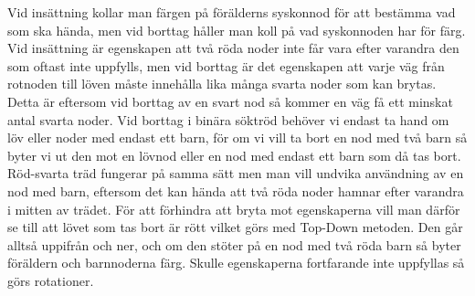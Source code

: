 \documentclass[a5paper,10pt,oneside]{article}
\begin{document}
Vid insättning kollar man färgen på förälderns syskonnod för att bestämma vad som ska hända, men vid borttag håller man koll på vad syskonnoden har för färg. Vid insättning är egenskapen att två röda noder inte får vara efter varandra den som oftast inte uppfylls, men vid borttag är det egenskapen att varje väg från rotnoden till löven måste innehålla lika många svarta noder som kan brytas. Detta är eftersom vid borttag av en svart nod så kommer en väg få ett minskat antal svarta noder. Vid borttag i binära söktröd behöver vi endast ta hand om löv eller noder med endast ett barn, för om vi vill ta bort en nod med två barn så byter vi ut den mot en lövnod eller en nod med endast ett barn som då tas bort. Röd-svarta träd fungerar på samma sätt men man vill undvika användning av en nod med barn, eftersom det kan hända att två röda noder hamnar efter varandra i mitten av trädet. För att förhindra att bryta mot egenskaperna vill man därför se till att lövet som tas bort är rött vilket görs med Top-Down metoden. Den går alltså uppifrån och ner, och om den stöter på en nod med två röda barn så byter föräldern och barnnoderna färg. Skulle egenskaperna fortfarande inte uppfyllas så görs rotationer.
\end{document}
